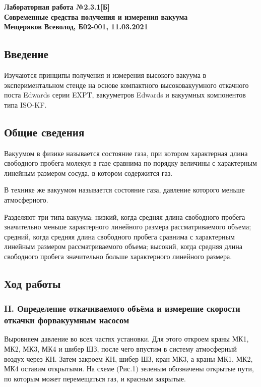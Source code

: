 \documentclass[a4paper, fontsize = 14pt]{article}
\begin{document}
\begin{center} \textbf{
Лабораторная работа №2.3.1[Б] \\ Современные средства получения и измерения вакуума \\
Мещеряков Всеволод, Б02-001, 11.03.2021}
\end{center} 

\subsection*{Введение}

Изучаются принципы получения и измерения высокого вакуума в экспериментальном стенде на основе компактного высоковакуумного откачного поста Edwards серии EXPT, вакууметров Edwards и вакуумных компонентов типа ISO-KF.

\subsection*{Общие сведения}

Вакуумом в физике называется состояние газа, при котором характерная длина свободного пробега молекул в газе сравнима по порядку величины с характерным линейным размером сосуда, в котором содержится газ.

В технике же вакуумом называется состояние газа, давление которого меньше атмосферного. 

Разделяют три типа вакуума: $\textbf{низкий}$, когда средняя длина свободного пробега значительно меньше характерного линейного размера рассматриваемого объема; $\textbf{средний}$, когда средняя длина свободного пробега сравнима с характерным линейным размером рассматриваемого объема; $\textbf{высокий}$, когда средняя длина свободного пробега значительно больше характерного линейного размера.

\subsection*{Ход работы}

\subsubsection*{II. Определение откачиваемого объёма и измерение скорости откачки форвакуумным насосом }

Выровняем давление во всех частях установки. Для этого откроем краны МК1, МК2, МК3, МК4 и шибер ШЗ, после чего впустим в систему атмосферный воздух через КН. Затем закроем КН, шибер ШЗ, кран МК3, а краны МК1, МК2, МК4 оставим открытыми. На схеме (Рис.1) зеленым обозначены открытые пути, по которым может перемещаться газ, и красным закрытые.
\end{document}

